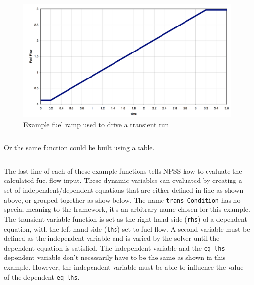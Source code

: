 \documentclass[heading.tex]{subfiles}
\begin{document}
\begin{figure}[H]
\centering
\includegraphics[width=1.0\textwidth]{images/fuelRamp}
\caption{Example fuel ramp used to drive a transient run}
\label{f:ramp}
\end{figure}

\begin{adjustwidth}{-1cm}{-1cm}
 \inputminted[]{c++}{code/rampFn}
 \end{adjustwidth} 
 
Or the same function could be built using a table. 
 
 \begin{adjustwidth}{-1cm}{-1cm}
 \inputminted[]{c++}{code/rampTb}
 \end{adjustwidth} 

The last line of each of these example functions tells NPSS how to evaluate the calculated fuel flow input.
These dynamic variables can evaluated by creating a set of independent/dependent equations
that are either defined in-line as shown above, or grouped together as show below.
The name \texttt{trans\_Condition} has no special meaning to the framework,
it's an arbitrary name chosen for this example.
The transient variable function is set as the right hand side (\texttt{rhs}) of a dependent equation,
with the left hand side (\texttt{lhs}) set to fuel flow. 
A second variable must be defined as the independent variable and is varied by the solver until the dependent
equation is satisfied.
The independent variable and the \texttt{eq\_lhs} dependent variable don't necessarily have to be the same
as shown in this example. However, the independent variable must be able to influence the
value of the dependent \texttt{eq\_lhs}.

 \begin{adjustwidth}{1cm}{-1cm}
 \inputminted[]{c++}{code/solverSetup}
 \end{adjustwidth} 
\end{document}

